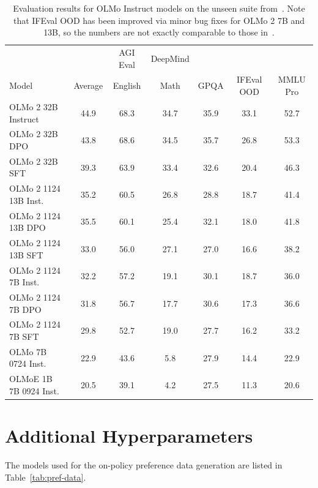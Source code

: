 \documentclass[table]{ai2style/ai2}
\begin{document}
\begin{table}[t]
\centering
\setlength\tabcolsep{3pt}
{\small
\begin{tabular}{l c c c c c c}
\hline
 &  & AGI Eval & DeepMind  &  &  & \\ 
Model & Average &  English &  Math & GPQA & IFEval OOD & MMLU Pro \\ \hline
OLMo 2 32B Instruct & 44.9 & 68.3 & 34.7 & 35.9 & 33.1 & 52.7 \\
OLMo 2 32B DPO & 43.8 & 68.6 & 34.5 & 35.7 & 26.8 & 53.3 \\
OLMo 2 32B SFT & 39.3 & 63.9 & 33.4 & 32.6 & 20.4 & 46.3 \\
OLMo 2 1124 13B Inst. & 35.2 & 60.5 & 26.8 & 28.8 & 18.7 & 41.4 \\
OLMo 2 1124 13B DPO & 35.5 & 60.1 & 25.4 & 32.1 & 18.0 & 41.8 \\
OLMo 2 1124 13B SFT & 33.0 & 56.0 & 27.1 & 27.0 & 16.6 & 38.2 \\
OLMo 2 1124 7B Inst. & 32.2 & 57.2 & 19.1 & 30.1 & 18.7 & 36.0 \\
OLMo 2 1124 7B DPO & 31.8 & 56.7 & 17.7 & 30.6 & 17.3 & 36.6 \\
OLMo 2 1124 7B SFT & 29.8 & 52.7 & 19.0 & 27.7 & 16.2 & 33.2 \\
OLMo 7B 0724 Inst. & 22.9 & 43.6 & 5.8 & 27.9 & 14.4 & 22.9 \\
OLMoE 1B 7B 0924 Inst. & 20.5 & 39.1 & 4.2 & 27.5 & 11.3 & 20.6 \\ \hline
\end{tabular}
}
\caption{Evaluation results for OLMo Instruct models on the unseen suite from~\citet{lambert2024tulu3}.
Note that IFEval OOD has been improved via minor bug fixes for OLMo 2 7B and 13B, so the numbers are not exactly comparable to those in~\citet{lambert2024tulu3}. }
\label{tab:instruct-unseen}
\end{table}

\clearpage
\section{Additional Hyperparameters}
The models used for the on-policy preference data generation are listed in Table~\ref{tab:pref-data}.
\end{document}
